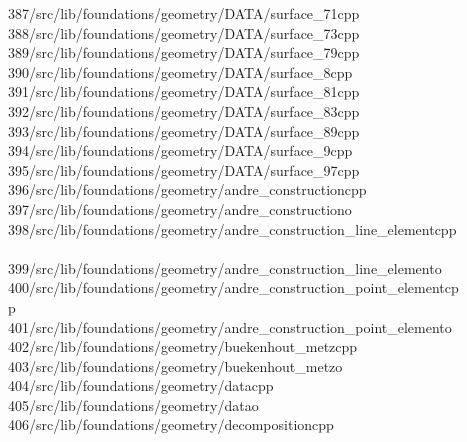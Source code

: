 \begin{tabbing}
387\>/src/lib/foundations/geometry/DATA/surface\_71cpp\\[0pt]
388\>/src/lib/foundations/geometry/DATA/surface\_73cpp\\[0pt]
389\>/src/lib/foundations/geometry/DATA/surface\_79cpp\\[0pt]
390\>/src/lib/foundations/geometry/DATA/surface\_8cpp\\[0pt]
391\>/src/lib/foundations/geometry/DATA/surface\_81cpp\\[0pt]
392\>/src/lib/foundations/geometry/DATA/surface\_83cpp\\[0pt]
393\>/src/lib/foundations/geometry/DATA/surface\_89cpp\\[0pt]
394\>/src/lib/foundations/geometry/DATA/surface\_9cpp\\[0pt]
395\>/src/lib/foundations/geometry/DATA/surface\_97cpp\\[0pt]
396\>/src/lib/foundations/geometry/andre\_constructioncpp\\[0pt]
397\>/src/lib/foundations/geometry/andre\_constructiono\\[0pt]
398\>/src/lib/foundations/geometry/andre\_construction\_line\_elementcpp\\[0pt]
\>\\[0pt]
399\>/src/lib/foundations/geometry/andre\_construction\_line\_elemento\\[0pt]
400\>/src/lib/foundations/geometry/andre\_construction\_point\_elementcp\\[0pt]
\>p\\[0pt]
401\>/src/lib/foundations/geometry/andre\_construction\_point\_elemento\\[0pt]
402\>/src/lib/foundations/geometry/buekenhout\_metzcpp\\[0pt]
403\>/src/lib/foundations/geometry/buekenhout\_metzo\\[0pt]
404\>/src/lib/foundations/geometry/datacpp\\[0pt]
405\>/src/lib/foundations/geometry/datao\\[0pt]
406\>/src/lib/foundations/geometry/decompositioncpp\\[0pt]

\end{tabbing}
